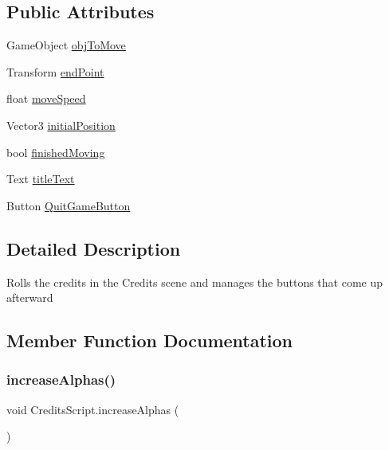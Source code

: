 \subsection*{Public Attributes}
\begin{DoxyCompactItemize}
\item 
Game\+Object \hyperlink{class_credits_script_aab6af5235394c7bc904ad65785bc8f31}{obj\+To\+Move}
\item 
Transform \hyperlink{class_credits_script_a1a7ba480a06d7f8bccdb07212e23c6c5}{end\+Point}
\item 
float \hyperlink{class_credits_script_aa10906c5f2d0a86707ec6755d953ea06}{move\+Speed}
\item 
Vector3 \hyperlink{class_credits_script_a592b962a0ac97ed95c8630dad261efe6}{initial\+Position}
\item 
bool \hyperlink{class_credits_script_a830a192ce2ae40b6b57e2e5e84f1bdbf}{finished\+Moving}
\item 
Text \hyperlink{class_credits_script_a82dd5ac0339aa56110dd0e0950a0c4c5}{title\+Text}
\item 
Button \hyperlink{class_credits_script_abe48b2113f4170b2ecd121d3476617e7}{Quit\+Game\+Button}
\end{DoxyCompactItemize}


\subsection{Detailed Description}
Rolls the credits in the Credits scene and manages the buttons that come up afterward 

\subsection{Member Function Documentation}
\mbox{\label{class_credits_script_ad37dc622426ba8d4a4b6a454d4ba81dd}} 
\subsubsection{\texorpdfstring{increase\+Alphas()}{increaseAlphas()}}
{\footnotesize\ttfamily void Credits\+Script.\+increase\+Alphas (\begin{DoxyParamCaption}{ }\end{DoxyParamCaption})}



